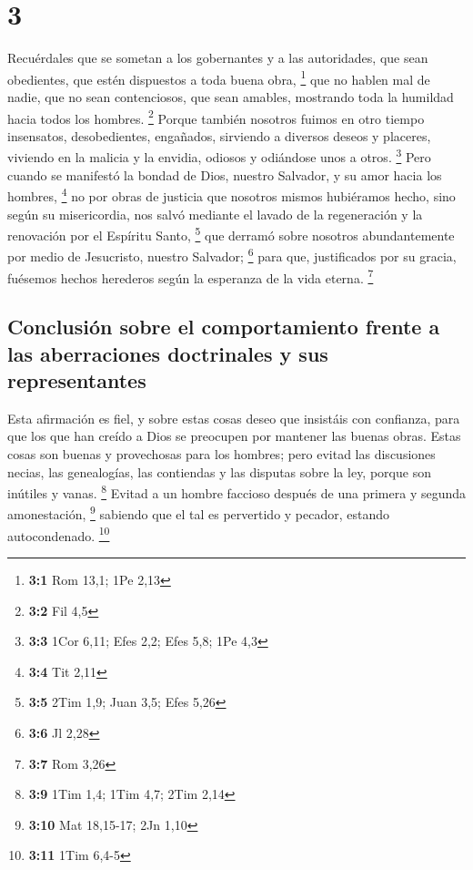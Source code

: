 \hypertarget{section-2}{%
\section{3}\label{section-2}}

 Recuérdales que se sometan a los gobernantes y a las
autoridades, que sean obedientes, que estén dispuestos a toda buena
obra, \footnote{\textbf{3:1} Rom 13,1; 1Pe 2,13}  que no
hablen mal de nadie, que no sean contenciosos, que sean amables,
mostrando toda la humildad hacia todos los hombres. \footnote{\textbf{3:2}
  Fil 4,5}  Porque también nosotros fuimos en otro tiempo
insensatos, desobedientes, engañados, sirviendo a diversos deseos y
placeres, viviendo en la malicia y la envidia, odiosos y odiándose unos
a otros. \footnote{\textbf{3:3} 1Cor 6,11; Efes 2,2; Efes 5,8; 1Pe 4,3}
 Pero cuando se manifestó la bondad de Dios, nuestro
Salvador, y su amor hacia los hombres, \footnote{\textbf{3:4} Tit 2,11}
 no por obras de justicia que nosotros mismos hubiéramos
hecho, sino según su misericordia, nos salvó mediante el lavado de la
regeneración y la renovación por el Espíritu Santo, \footnote{\textbf{3:5}
  2Tim 1,9; Juan 3,5; Efes 5,26}  que derramó sobre
nosotros abundantemente por medio de Jesucristo, nuestro Salvador;
\footnote{\textbf{3:6} Jl 2,28}  para que, justificados
por su gracia, fuésemos hechos herederos según la esperanza de la vida
eterna. \footnote{\textbf{3:7} Rom 3,26}

\hypertarget{conclusiuxf3n-sobre-el-comportamiento-frente-a-las-aberraciones-doctrinales-y-sus-representantes}{%
\subsection{Conclusión sobre el comportamiento frente a las aberraciones
doctrinales y sus
representantes}\label{conclusiuxf3n-sobre-el-comportamiento-frente-a-las-aberraciones-doctrinales-y-sus-representantes}}

 Esta afirmación es fiel, y sobre estas cosas deseo que
insistáis con confianza, para que los que han creído a Dios se preocupen
por mantener las buenas obras. Estas cosas son buenas y provechosas para
los hombres;  pero evitad las discusiones necias, las
genealogías, las contiendas y las disputas sobre la ley, porque son
inútiles y vanas. \footnote{\textbf{3:9} 1Tim 1,4; 1Tim 4,7; 2Tim 2,14}
 Evitad a un hombre faccioso después de una primera y
segunda amonestación, \footnote{\textbf{3:10} Mat 18,15-17; 2Jn 1,10}
 sabiendo que el tal es pervertido y pecador, estando
autocondenado. \footnote{\textbf{3:11} 1Tim 6,4-5}

